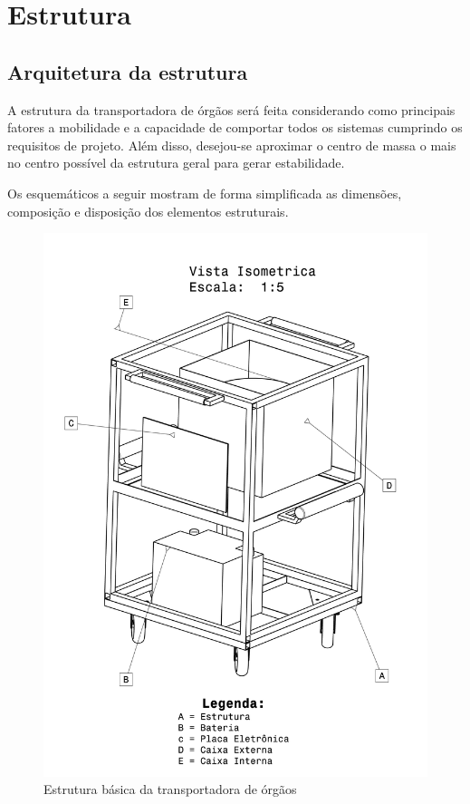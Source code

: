 \section{Estrutura}

\subsection{Arquitetura da estrutura}
A estrutura da transportadora de órgãos será feita considerando como principais fatores a  mobilidade e a capacidade de comportar todos os sistemas cumprindo os requisitos de projeto. Além disso, desejou-se aproximar o centro de massa o mais no centro possível da estrutura geral para gerar estabilidade.

Os esquemáticos a seguir mostram de forma simplificada as dimensões, composição e disposição dos elementos estruturais.

\begin{figure}[H]
\centering
\includegraphics[scale=0.15]{figuras/estrutura.png}
\caption{Estrutura básica da transportadora de órgãos}
\end{figure}

